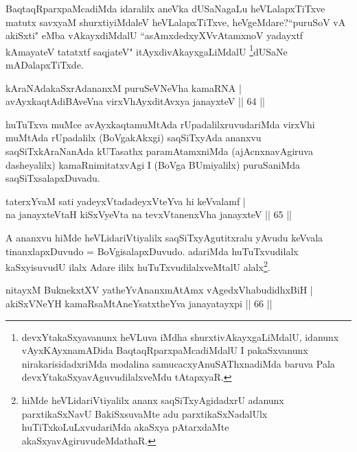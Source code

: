 \begin{artha}
BaqtaqRparxpaMcadiMda idaralilx aneVka dUSaNagaLu heVLalapxTiTxve matutx savxyaM 
shurxtiyiMdaleV heVLalapxTiTxve, heVgeMdare?``puruSoV vA akiSxti" eMba vAkayxdiMdalU ``asAmxdedxyXV\s \s vAtamxnoV yadayxtf kAmayateV tatatxtf saqjateV" itAyxdivAkayxgaLiMdalU
\footnote{devxYtakaSxyavanunx heVLuva iMdha shurxtivAkayxgaLiMdalU, idanunx vAyxKAyxnamADida BaqtaqRparxpaMcadiMdalU I pakaSxvanunx nirakarisidadxriMda modalina samucacxyAnuSAThxna\-\break diMda baruva Pala  devxYtakaSxyavAguvudilalxveMdu tAtapxyaR.}dUSaNe mADalapxTiTxde.
\end{artha}


\begin{shl}
kAraNAdakaSxrAdananxM puruSeVNeVha kamaRNA |\\
avAyxkaqtAdiBAveVna virxVhAyxditAvxya janayxteV \hfill || 64 ||
\end{shl}

\begin{artha}
huTuTxva muMce avAyxkaqtamuMtAda rUpadalilxruvudariMda virxVhi muMtAda rUpadalilx (BoVgakAkxgi) saqSiTxyAda ananxvu saqSiTxkAraNanAda kUTasathx paramAtamxniMda (ajAcnxnavAgiruva dasheyalilx) kamaRnimitatxvAgi I (BoVga BUmiyalilx) puruSaniMda saqSiTxsalapxDuvadu.
\end{artha}


\begin{shl}
taterxYvaM sati yadeyxVtadadeyxVteYva hi keVvalamf |\\
na janayxteV\s taH kiSxVyeVta na tevxVtanenxVha janayxteV \hfill || 65 ||
\end{shl}

\begin{artha}
A ananxvu hiMde heVLidariVtiyalilx saqSiTxyAgutitxralu yAvudu keVvala tinanxlapxDuvudo = BoVgisalapxDuvudo. adariMda huTuTxvudilalx kaSxyisuvudU ilalx Adare ililx huTuTxvudilalxveMtalU alalx\footnote{hiMde heVLidariVtiyalilx ananx saqSiTxyAgidadxrU adanunx parxtikaSxNavU BakiSxsuvaMte adu parxtikaSxNadalUlx huTiTxkoLuLxvudariMda akaSxya pAtarxdaMte akaSxyavAgiruvudeMdathaR.}.
\end{artha}


\begin{shl}
nitayxM BuknekxtXV yatheYvAnanxmAtAmx vAgedxVhabudidhxBiH |\\
akiSxVNeYH kamaRsaMtAneYsatxtheYva janayatayxpi \hfill || 66 ||
\end{shl}

